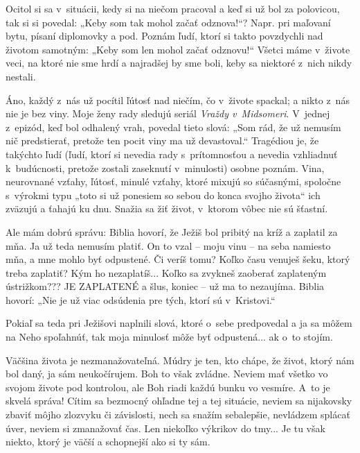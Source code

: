 
Ocitol si sa v~situácii, kedy si na niečom pracoval a keď si už bol za polovicou, tak si si povedal: „Keby som tak mohol začať odznova!“? Napr. pri maľovaní bytu, písaní diplomovky a pod. Poznám ľudí, ktorí si takto povzdychli nad životom samotným: „Keby som len mohol začať odznovu!“ Všetci máme v~živote veci, na ktoré nie sme hrdí a najradšej by sme boli, keby sa niektoré z~nich nikdy nestali.

Áno, každý z~nás už pocítil ľútosť nad niečím, čo v~živote spackal; a nikto z~nás nie je bez viny. Moje ženy rady sledujú seriál {\it Vraždy v~Midsomeri}. V~jednej z~epizód, keď bol odhalený vrah, povedal tieto slová: „Som rád, že už nemusím nič predstierať, pretože ten pocit viny ma už devastoval.“ Tragédiou je, že takýchto ľudí (ľudí, ktorí si nevedia rady s~prítomnosťou a nevedia vzhliadnuť k~budúcnosti, pretože zostali zaseknutí v~minulosti) osobne poznám. Vina, neurovnané vzťahy, ľútosť, minulé vzťahy, ktoré mixujú so súčasnými, spoločne s~výrokmi typu „toto si už ponesiem so sebou do konca svojho života“ ich zväzujú a ťahajú ku dnu. Snažia sa žiť život, v~ktorom vôbec nie sú šťastní.

Ale mám dobrú správu: Biblia hovorí, že Ježiš bol pribitý na kríž a zaplatil za mňa. Ja už teda nemusím platiť. On to vzal -- moju vinu -- na seba namiesto mňa, a mne mohlo byť odpustené. Či veríš tomu? Koľko času venuješ šeku, ktorý treba zaplatiť? Kým ho nezaplatíš... Koľko sa zvykneš zaoberať zaplateným ústrižkom??? JE ZAPLATENÉ a šlus, koniec -- už ma to nezaujíma. Biblia hovorí: „Nie je už viac odsúdenia pre tých, ktorí sú v~Kristovi.“

Pokiaľ sa teda pri Ježišovi naplnili slová, ktoré o~sebe predpovedal a ja sa môžem na Neho spoľahnúť, tak moja minulosť môže byť odpustená... ak o~to stojím.


Väčšina života je nezmanažovateľná. Múdry je ten, kto chápe, že život, ktorý nám bol daný, ja sám neukočírujem. Boh to však zvládne. Neviem mať všetko vo svojom živote pod kontrolou, ale Boh riadi každú bunku vo vesmíre. A~to je skvelá správa! Cítim sa bezmocný ohľadne tej a tej situácie, neviem sa nijakovsky zbaviť môjho zlozvyku či závislosti, nech sa snažím sebalepšie, nevládzem splácať úver, neviem si zmanažovať  čas. Len niekoľko výkrikov do tmy... Je tu však niekto, ktorý je väčší a schopnejší ako si ty sám.

